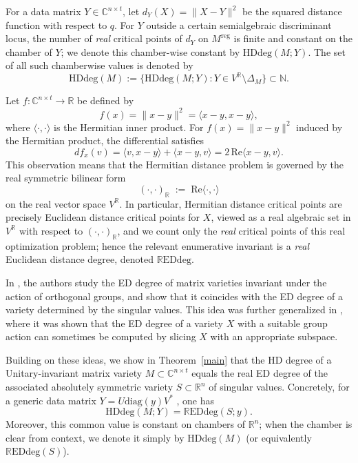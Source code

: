 \documentclass[11pt]{amsart}
\def\N{\mathbb N}\let\en\N
\def\R{\mathbb R}\let\er\R
\def\C{\mathbb C}\let\ce\C
\theoremstyle{plain}
\theoremstyle{definition}
\theoremstyle{remark}
\begin{document}
For a data matrix $Y\in\C^{n\times t}$, let $d_Y(X)=\|X-Y\|^2$ be the squared distance function
with respect to $q$.  For $Y$ outside a certain semialgebraic discriminant locus, the number of
\emph{real} critical points of $d_Y$ on $M^{\mathrm{reg}}$ is finite and constant on the chamber
of $Y$; we denote this chamber-wise constant by $\mathrm{HDdeg}(M;Y)$. The set of all such chamberwise values is denoted by
\[
\mathrm{HDdeg}(M):=\{\mathrm{HDdeg}(M;Y): Y\in V^{\R}\setminus \Delta_M\}\subset\N.
\]



Let $f: \mathbb{C}^{n\times t} \to \mathbb{R}$ be defined by
\[
f(x) = \|x - y\|^2 = \langle x - y, x - y \rangle,
\]
where $\langle \cdot, \cdot \rangle$ is the Hermitian inner product.
For $f(x)=\|x-y\|^2$ induced by the Hermitian product, the differential satisfies
\[
df_x(v)=\langle v,x-y\rangle+\langle x-y,v\rangle
=2\,\mathrm{Re}\langle x-y,v\rangle .
\]
This observation means that the Hermitian distance problem is governed by the real symmetric bilinear form
\[
(\cdot,\cdot)_{\mathbb{R}} \;:=\; \mathrm{Re}\langle \cdot,\cdot\rangle
\]
on the real vector space \(V^{\mathbb{R}}\). In particular, Hermitian distance critical points are precisely Euclidean distance
critical points for \(X\), viewed as a real algebraic set in \(V^{\mathbb{R}}\) with respect to \((\cdot,\cdot)_{\mathbb{R}}\),
and we count only the \emph{real} critical points of this real optimization problem; hence the relevant enumerative invariant is a
\emph{real} Euclidean distance degree, denoted \(\mathrm{\mathbb{R}EDdeg}\).

In \cite{drusvyatskiy2017euclidean}, the authors study the ED degree of matrix varieties invariant under the action of
orthogonal groups, and show that it coincides with the ED degree of a variety determined by the singular values. This idea was
further generalized in \cite{bik2018eddegrees}, where it was shown that the ED degree of a variety $X$ with a suitable group action
can sometimes be computed by slicing $X$ with an appropriate subspace.

Building on these ideas, we show in Theorem~\ref{main} that the HD degree of a Unitary-invariant matrix variety
$M \subset \mathbb{C}^{n \times t}$ equals the real ED degree of the associated absolutely symmetric variety
$S \subset \mathbb{R}^n$ of singular values. Concretely, for a generic data matrix $Y=U\mathrm{diag}(y)V^*$
, one has
\[
\mathrm{HDdeg}(M;Y)=\mathrm{\mathbb{R}EDdeg}(S;y).
\]
Moreover, this common value is constant on chambers of $\mathbb{R}^n$; when the chamber is clear from context,
we denote it simply by $\mathrm{HDdeg}(M)$ (or equivalently $\mathrm{\mathbb{R}EDdeg}(S)$).
\end{document}
